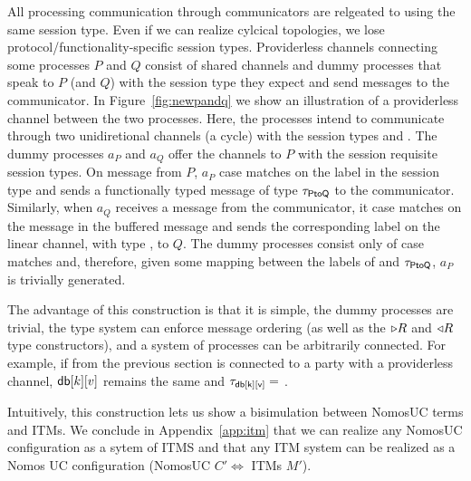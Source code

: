 All processing communication through communicators are relgeated to using the same session type. 
Even if we can realize cylcical topologies, we lose protocol/functionality-specific session types.
Providerless channels connecting some processes $P$ and $Q$ consist of shared channels and dummy processes that speak to $P$ (and $Q$) with the session type they expect and send messages to the communicator. 
In Figure~\ref{fig:newpandq} we show an illustration of a providerless channel between the two processes. 
Here, the processes intend to communicate through two unidiretional channels (a cycle) with the session types  and .
The dummy processes $a_P$ and $a_Q$ offer the channels to $P$ with the session requisite session types.
On message from $P$, $a_P$ case matches on the label in the session type and sends a functionally typed message of type $\tau_{\mathsf{PtoQ}}$ to the communicator. 
Similarly, when $a_Q$ receives a message from the communicator, it case matches on the message in the buffered message and sends the corresponding label on the linear channel, with type , to $Q$. 
The dummy processes consist only of case matches and, therefore, given some mapping between the labels of  and $\tau_{\mathsf{PtoQ}}$, $a_P$ is trivially generated. 

The advantage of this construction is that it is simple, the dummy processes are trivial, the type system can enforce message ordering (as well as the $\triangleright{R}$ and $\triangleleft{R}$ type constructors), and a system of processes can be arbitrarily connected. 
For example, if \Fdb from the previous section is connected to a party with a providerless channel, 
$\mathsf{db}[k][v]$ remains the same and $\tau_{\mathsf{db[k][v]}} =$    . 

Intuitively, this construction lets us show a bisimulation between NomosUC terms and ITMs.
We conclude in Appendix~\ref{app:itm} that we can realize any NomosUC configuration as a sytem of ITMS and that any ITM system can be realized as a Nomos UC configuration (NomosUC $C' \Leftrightarrow$ ITMs $M'$).

